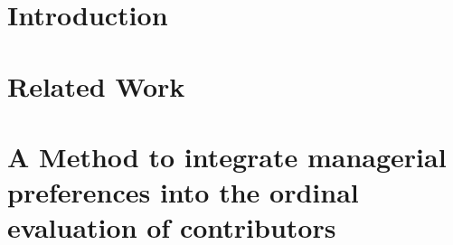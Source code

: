 \documentclass{misqdoc} %
\begin{document}
%


\section{Introduction}\label{sec:introduction}


\section{Related Work}\label{sec:related}


\section{A Method to integrate managerial preferences into the ordinal evaluation of contributors}\label{sec:methodology}

\end{document}
